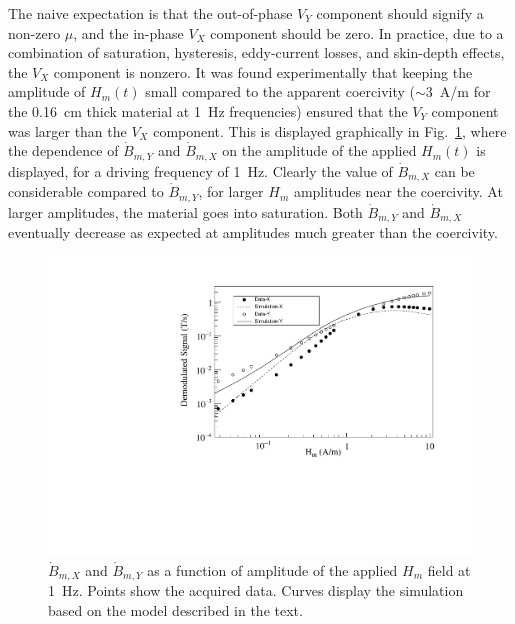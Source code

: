 The naive expectation is that the out-of-phase $V_Y$ component should
signify a non-zero $\mu$, and the in-phase $V_X$ component should be
zero.  In practice, due to a combination of saturation, hysteresis,
eddy-current losses, and skin-depth effects, the $V_X$ component is
nonzero.  It was found experimentally that keeping the amplitude of
$H_m(t)$ small compared to the apparent coercivity ($\sim 3$~A/m for
the 0.16~cm thick material at 1~Hz frequencies) ensured that the $V_Y$
component was larger than the $V_X$ component.  This is displayed
graphically in Fig.~\ref{fig:data_and_simulation}, where the
dependence of $\dot{B}_{m,Y}$ and $\dot{B}_{m,X}$ on the amplitude of
the applied $H_m(t)$ is displayed, for a driving frequency of 1~Hz.
Clearly the value of $\dot{B}_{m,X}$ can be considerable compared to
$\dot{B}_{m,Y}$, for larger $H_m$ amplitudes near the coercivity.  At
larger amplitudes, the material goes into saturation.  Both
$\dot{B}_{m,Y}$ and $\dot{B}_{m,X}$ eventually decrease as expected at
amplitudes much greater than the coercivity.


\begin{figure}[h!]
  \begin{center}
    \includegraphics[width=\textwidth]{Jiles_and_data.pdf}
    \caption[Demodulated signal as a function of amplitude of the
    applied $H_m$ field]{$\dot{B}_{m,X}$ and $\dot{B}_{m,Y}$ as a
      function of amplitude of the applied $H_m$ field at 1~Hz.
      Points show the acquired data.  Curves display the simulation
      based on the model described in the text.}
    \label{fig:data_and_simulation}
  \end{center}
\end{figure} 


